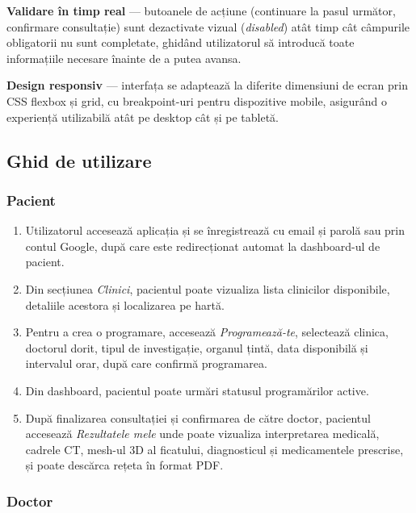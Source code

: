 \documentclass[12pt, a4paper]{report}
\begin{document}
\textbf{Validare în timp real} --- butoanele de acțiune (continuare la pasul
următor, confirmare consultație) sunt dezactivate vizual (\textit{disabled}) atât
timp cât câmpurile obligatorii nu sunt completate, ghidând utilizatorul să
introducă toate informațiile necesare înainte de a putea avansa.

\textbf{Design responsiv} --- interfața se adaptează la diferite dimensiuni de
ecran prin CSS flexbox și grid, cu breakpoint-uri pentru dispozitive mobile,
asigurând o experiență utilizabilă atât pe desktop cât și pe tabletă.


\subsection{Ghid de utilizare}

\subsubsection{Pacient}

\begin{enumerate}
    \item Utilizatorul accesează aplicația și se înregistrează cu email și parolă
          sau prin contul Google, după care este redirecționat automat la
          dashboard-ul de pacient.
    \item Din secțiunea \textit{Clinici}, pacientul poate vizualiza lista clinicilor
          disponibile, detaliile acestora și localizarea pe hartă.
    \item Pentru a crea o programare, accesează \textit{Programează-te}, selectează
          clinica, doctorul dorit, tipul de investigație, organul țintă, data
          disponibilă și intervalul orar, după care confirmă programarea.
    \item Din dashboard, pacientul poate urmări statusul programărilor active.
    \item După finalizarea consultației și confirmarea de către doctor, pacientul
          accesează \textit{Rezultatele mele} unde poate vizualiza interpretarea
          medicală, cadrele CT, mesh-ul 3D al ficatului, diagnosticul și
          medicamentele prescrise, și poate descărca rețeta în format PDF.
\end{enumerate}

\subsubsection{Doctor}
\end{document}
